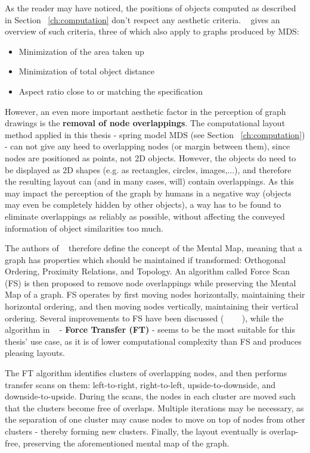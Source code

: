 As the reader may have noticed, the positions of objects computed as described in Section ~\ref{ch:computation} don't respect any aesthetic criteria. ~\cite{Li:2005} gives an overview of such criteria, three of which also apply to graphs produced by MDS:

\begin{itemize}
	\item Minimization of the area taken up
	\item Minimization of total object distance
	\item Aspect ratio close to or matching the specification
\end{itemize}

However, an even more important aesthetic factor in the perception of graph drawings is the \textbf{removal of node overlappings}. The computational layout method applied in this thesis - spring model MDS (see Section ~\ref{ch:computation}) - can not give any heed to overlapping nodes (or margin between them), since nodes are positioned as points, not 2D objects. However, the objects do need to be displayed as 2D shapes (e.g. as rectangles, circles, images,...), and therefore the resulting layout can (and in many cases, will) contain overlappings.
As this may impact the perception of the graph by humans in a negative way (objects may even be completely hidden by other objects), a way has to be found to eliminate overlappings as reliably as possible, without affecting the conveyed information of object similarities too much.

The authors of ~\cite{journals/vlc/MisueELS95} therefore define the concept of the Mental Map, meaning that a graph has properties which should be maintained if transformed: Orthogonal Ordering, Proximity Relations, and Topology. An algorithm called Force Scan (FS) is then proposed to remove node overlappings while preserving the Mental Map of a graph. FS operates by first moving nodes horizontally, maintaining their horizontal ordering, and then moving nodes vertically, maintaining their vertical ordering. Several improvements to FS have been discussed (~\cite{Hayashi:1998:LAP:647550.728930} ~\cite{Huang03force-transfer:a} ~\cite{Li:2005}), while the algorithm in ~\cite{Huang03force-transfer:a} - \textbf{Force Transfer (FT)} - seems to be the most suitable for this thesis' use case, as it is of lower computational complexity than FS and produces pleasing layouts.

The FT algorithm identifies clusters of overlapping nodes, and then performs transfer scans on them: left-to-right, right-to-left, upside-to-downside, and downside-to-upside. During the scans, the nodes in each cluster are moved such that the clusters become free of overlaps. Multiple iterations may be necessary, as the separation of one cluster may cause nodes to move on top of nodes from other clusters - thereby forming new clusters. Finally, the layout eventually is overlap-free, preserving the aforementioned mental map of the graph.

